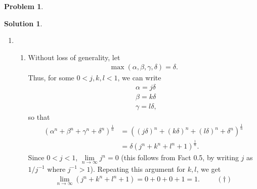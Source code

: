 \documentclass{book}
\theoremstyle{definition}
\newtheorem*{prob*}{Problem}
\newtheorem*{sln*}{Solution}
\begin{document}
\begin{prob*}
	\begin{sln*}
		$\,$\\
		\begin{enumerate}
			\item
			\begin{enumerate}
				\item Without loss of generality, let 
				\begin{align*}
				\max(\alpha, \beta, \gamma, \delta) = \delta.
				\end{align*}
				Thus, for some $0 < j,k,l < 1$, we can write
				\begin{align*}
				&\alpha = j\delta\\
				&\beta = k\delta\\
				&\gamma = l\delta,
				\end{align*}
				so that
				\begin{align*}
				 (\alpha^n + \beta^n + \gamma^n + \delta^n)^{\frac{1}{n}} &= \left( (j\delta)^n + (k\delta)^n + (l\delta)^n + \delta^n  \right)^{\frac{1}{n}}\\ &= \delta \left(j^n + k^n + l^n + 1\right)^{\frac{1}{n}}.
				\end{align*}
				Since $0 < j < 1$, $\lim\limits_{n\to\infty}j^n = 0$ (this follows from Fact 0.5, by writing $j$ as $1/j^{-1}$ where $j^{-1} > 1$). Repeating this argument for $k,l$, we get
				\begin{align*}
				\lim\limits_{n\to\infty} (j^n + k^n + l^n + 1) = 0 +0 +0 +1 = 1. \hspace{1cm} (\dagger)
				\end{align*}
				

\end{enumerate}
\end{enumerate}
\end{sln*}
\end{prob*}
\end{document}
